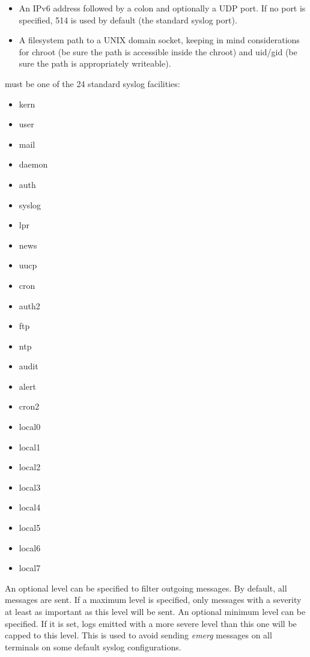 \begin{keywords}
\begin{itemize}
	\item An IPv6 address followed by a colon and optionally a UDP port. If
          no port is specified, 514 is used by default (the standard syslog
          port).

	\item A filesystem path to a UNIX domain socket, keeping in mind
          considerations for chroot (be sure the path is accessible inside
          the chroot) and uid/gid (be sure the path is appropriately
          writeable).
	\end{itemize}

   must be one of the 24 standard syslog facilities:
	\begin{multicols}{4}\begin{itemize}
	\item kern   \item user   \item mail   \item daemon \item auth   \item syslog \item lpr    \item news
	\item uucp   \item cron   \item auth2  \item ftp    \item ntp    \item audit  \item alert  \item cron2
	\item local0 \item local1 \item local2 \item local3 \item local4 \item local5 \item local6 \item local7
	\end{itemize}\end{multicols}

  An optional level can be specified to filter outgoing messages. By default,
  all messages are sent. If a maximum level is specified, only messages with a
  severity at least as important as this level will be sent. An optional minimum
  level can be specified. If it is set, logs emitted with a more severe level
  than this one will be capped to this level. This is used to avoid sending
  \emph{emerg} messages on all terminals on some default syslog configurations.


\end{keywords}
